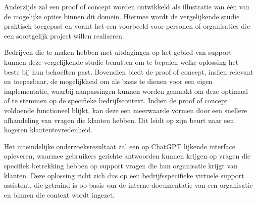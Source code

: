 Anderzijds zal een proof of concept worden ontwikkeld als illustratie van één van de mogelijke opties binnen dit domein. Hiermee wordt de vergelijkende studie praktisch toegepast en vormt het een voorbeeld voor personen of organisaties die een soortgelijk project willen realiseren.

Bedrijven die te maken hebben met uitdagingen op het gebied van support kunnen deze vergelijkende studie benutten om te bepalen welke oplossing het beste bij hun behoeften past. Bovendien biedt de proof of concept, indien relevant en toepasbaar, de mogelijkheid om als basis te dienen voor een eigen implementatie, waarbij aanpassingen kunnen worden gemaakt om deze optimaal af te stemmen op de specifieke bedrijfscontext. Indien de proof of concept voldoende functioneel blijkt, kan deze een meerwaarde vormen door een snellere afhandeling van vragen die klanten hebben. Dit leidt op zijn beurt naar een hogeren klantentevredenheid. 

Het uiteindelijke onderzoeksresultaat zal een op ChatGPT lijkende interface opleveren, waarmee gebruikers gerichte antwoorden kunnen krijgen op vragen die specifiek betrekking hebben op support vragen die hun organisatie krijgt van klanten. Deze oplossing richt zich dus op een bedrijfsspecifieke virtuele support assistent, die getraind is op basis van de interne documentatie van een organisatie en binnen die context wordt ingezet.


